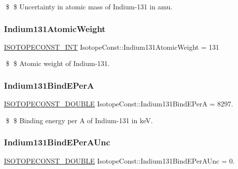 \$ \$ Uncertainty in atomic mass of Indium-\/131 in amu. \mbox{\label{group___isotope_const-_indium-_in131_gaefaeeedf914614a83935a180375c573e}} 
\subsubsection{\texorpdfstring{Indium131\+Atomic\+Weight}{Indium131AtomicWeight}}
{\footnotesize\ttfamily \mbox{\hyperlink{group___isotope_const-_macros_ga5f18360b3e99483a35c32d789e62621c}{I\+S\+O\+T\+O\+P\+E\+C\+O\+N\+S\+T\+\_\+\+I\+NT}} Isotope\+Const\+::\+Indium131\+Atomic\+Weight = 131}

\$ \$ Atomic weight of Indium-\/131. \mbox{\label{group___isotope_const-_indium-_in131_ga31cc8c01bb78024ee0ba1ea59ac14f27}} 
\subsubsection{\texorpdfstring{Indium131\+Bind\+E\+PerA}{Indium131BindEPerA}}
{\footnotesize\ttfamily \mbox{\hyperlink{group___isotope_const-_macros_ga8f45a7272ce02c0b4c65c44636ed719a}{I\+S\+O\+T\+O\+P\+E\+C\+O\+N\+S\+T\+\_\+\+D\+O\+U\+B\+LE}} Isotope\+Const\+::\+Indium131\+Bind\+E\+PerA = 8297.}

\$ \$ Binding energy per A of Indium-\/131 in keV. \mbox{\label{group___isotope_const-_indium-_in131_gaf744cb907b79a51f830d072cad3fa54f}} 
\subsubsection{\texorpdfstring{Indium131\+Bind\+E\+Per\+A\+Unc}{Indium131BindEPerAUnc}}
{\footnotesize\ttfamily \mbox{\hyperlink{group___isotope_const-_macros_ga8f45a7272ce02c0b4c65c44636ed719a}{I\+S\+O\+T\+O\+P\+E\+C\+O\+N\+S\+T\+\_\+\+D\+O\+U\+B\+LE}} Isotope\+Const\+::\+Indium131\+Bind\+E\+Per\+A\+Unc = 0.}

